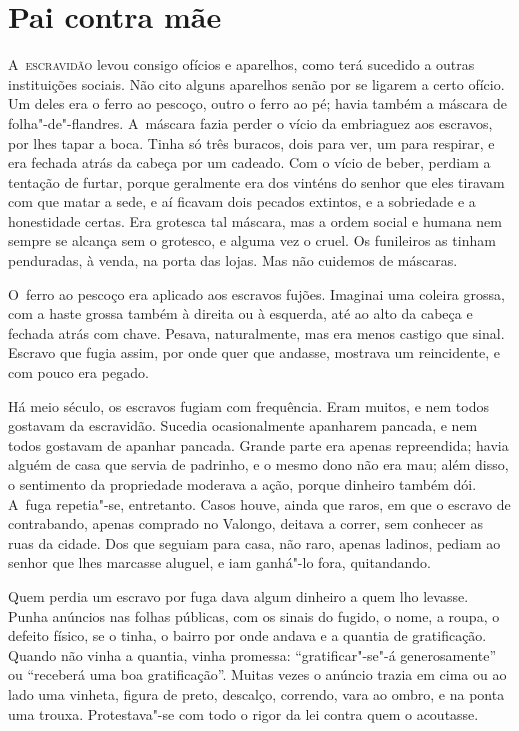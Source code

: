 \chapter{Pai contra mãe}

\begin{linenumbers}

\textsc{A~escravidão} levou consigo ofícios e aparelhos, como terá sucedido a
outras instituições sociais. Não cito alguns aparelhos senão por se
ligarem a certo ofício. Um deles era o ferro ao pescoço, outro o ferro
ao pé; havia também a máscara de folha"-de"-flandres. A~máscara fazia
perder o vício da embriaguez aos escravos, por lhes tapar a boca. Tinha
só três buracos, dois para ver, um para respirar, e era fechada atrás da
cabeça por um cadeado. Com o vício de beber, perdiam a tentação de
furtar, porque geralmente era dos vinténs do senhor que eles tiravam com
que matar a sede, e aí ficavam dois pecados extintos, e a sobriedade e a
honestidade certas. Era grotesca tal máscara, mas a ordem social e
humana nem sempre se alcança sem o grotesco, e alguma vez o cruel. Os
funileiros as tinham penduradas, à venda, na porta das lojas. Mas não
cuidemos de máscaras.

O~ferro ao pescoço era aplicado aos escravos fujões. Imaginai uma
coleira grossa, com a haste grossa também à direita ou à esquerda, até
ao alto da cabeça e fechada atrás com chave. Pesava, naturalmente, mas
era menos castigo que sinal. Escravo que fugia assim, por onde quer que
andasse, mostrava um reincidente, e com pouco era pegado.

Há meio século, os escravos fugiam com frequência. Eram muitos, e nem
todos gostavam da escravidão. Sucedia ocasionalmente apanharem pancada,
e nem todos gostavam de apanhar pancada. Grande parte era apenas
repreendida; havia alguém de casa que servia de padrinho, e o mesmo dono
não era mau; além disso, o sentimento da propriedade moderava a ação,
porque dinheiro também dói. A~fuga repetia"-se, entretanto. Casos houve,
ainda que raros, em que o escravo de contrabando, apenas comprado no
Valongo, deitava a correr, sem conhecer as ruas da cidade. Dos que
seguiam para casa, não raro, apenas ladinos, pediam ao senhor que lhes
marcasse aluguel, e iam ganhá"-lo fora, quitandando.

Quem perdia um escravo por fuga dava algum dinheiro a quem lho levasse.
Punha anúncios nas folhas públicas, com os sinais do fugido, o nome, a
roupa, o defeito físico, se o tinha, o bairro por onde andava e a
quantia de gratificação. Quando não vinha a quantia, vinha promessa:
``gratificar"-se"-á generosamente'' ou ``receberá uma boa gratificação''.
Muitas vezes o anúncio trazia em cima ou ao lado uma vinheta, figura de
preto, descalço, correndo, vara ao ombro, e na ponta uma trouxa.
Protestava"-se com todo o rigor da lei contra quem o acoutasse.


\end{linenumbers}
